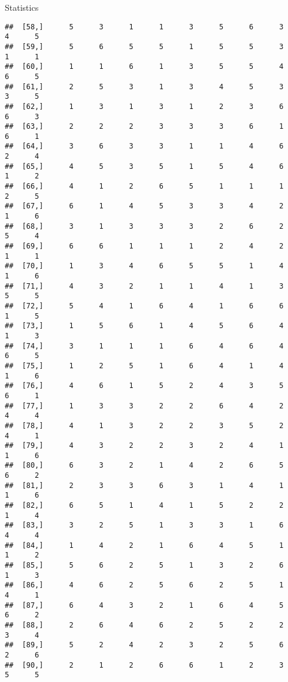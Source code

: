 \documentclass[
  ignorenonframetext,
]{beamer}
\begin{document}
\begin{frame}[fragile]{Statistics}
\begin{verbatim}
##  [58,]      5      3      1      1      3      5      6      3      4      5
##  [59,]      5      6      5      5      1      5      5      3      1      1
##  [60,]      1      1      6      1      3      5      5      4      6      5
##  [61,]      2      5      3      1      3      4      5      3      3      5
##  [62,]      1      3      1      3      1      2      3      6      6      3
##  [63,]      2      2      2      3      3      3      6      1      6      1
##  [64,]      3      6      3      3      1      1      4      6      2      4
##  [65,]      4      5      3      5      1      5      4      6      1      2
##  [66,]      4      1      2      6      5      1      1      1      2      5
##  [67,]      6      1      4      5      3      3      4      2      1      6
##  [68,]      3      1      3      3      3      2      6      2      5      4
##  [69,]      6      6      1      1      1      2      4      2      1      1
##  [70,]      1      3      4      6      5      5      1      4      1      6
##  [71,]      4      3      2      1      1      4      1      3      5      5
##  [72,]      5      4      1      6      4      1      6      6      1      5
##  [73,]      1      5      6      1      4      5      6      4      1      3
##  [74,]      3      1      1      1      6      4      6      4      6      5
##  [75,]      1      2      5      1      6      4      1      4      1      6
##  [76,]      4      6      1      5      2      4      3      5      6      1
##  [77,]      1      3      3      2      2      6      4      2      4      4
##  [78,]      4      1      3      2      2      3      5      2      4      1
##  [79,]      4      3      2      2      3      2      4      1      1      6
##  [80,]      6      3      2      1      4      2      6      5      6      2
##  [81,]      2      3      3      6      3      1      4      1      1      6
##  [82,]      6      5      1      4      1      5      2      2      1      4
##  [83,]      3      2      5      1      3      3      1      6      4      4
##  [84,]      1      4      2      1      6      4      5      1      1      2
##  [85,]      5      6      2      5      1      3      2      6      1      3
##  [86,]      4      6      2      5      6      2      5      1      4      1
##  [87,]      6      4      3      2      1      6      4      5      6      2
##  [88,]      2      6      4      6      2      5      2      2      3      4
##  [89,]      5      2      4      2      3      2      5      6      2      6
##  [90,]      2      1      2      6      6      1      2      3      5      5

\end{verbatim}
\end{frame}
\end{document}

